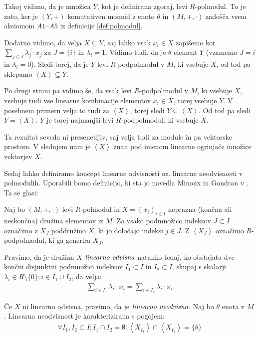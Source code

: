 \documentclass[mat1]{fmfdelo}
\newcommand{\pojem}[1]{\ensuremath{\emph{#1}}}
\newcommand{\Gen}[1]{\ensuremath{\left<{#1}\right>}}
\begin{document}
\begin{dokaz}
	
	Takoj vidimo, da je množica $Y$, kot je definirana zgoraj, levi $R$-polmodul. To je zato, ker je $(Y, +)$ komutativen monoid z enoto $\theta$ in $(M, +, \cdot)$ zadošča vsem aksiomom $A1$--$A5$ iz definicije \ref{def:polmodul}.
	
	Dodatno vidimo, da velja $X \subseteq Y$, saj lahko vsak $x_i\in X$ zapišemo kot $\sum_{j\in J}\lambda_j\cdot x_j$ za $J = \{i\}$ in $\lambda_i = 1$. Vidimo tudi, da je $\theta$ element $Y$ (vzamemo $J = {i}$ in $\lambda_i = 0$). Sledi torej, da je $Y$ levi $R$-podpolmodul v $M$, ki vsebuje $X$, od tod pa sklepamo $\Gen{X} \subseteq Y$. 
	
	Po drugi strani pa vidimo še, da vsak levi $R$-podpolmodul v $M$, ki vsebuje $X$, vsebuje tudi vse linearne kombinacije elementov $x_i\in X$, torej vsebuje $Y$. V posebnem primeru velja to tudi za \Gen{X}, torej sledi $Y \subseteq \Gen{X}$. Od tod pa sledi $Y = \Gen{X}$. $Y$ je torej najmanjši levi $R$-podpolmodul, ki vsebuje $X$.
\end{dokaz}

Ta rezultat seveda ni presenetljiv, saj velja tudi za module in pa vektorske prostore. V slednjem nam je \Gen{X} znan pod imenom linearne ogrinjače množice vektorjev $X$.

Sedaj lahko definiramo koncept linearne odvisnosti oz. linearne neodvisnosti v polmodulih. Uporabili bomo definicijo, ki sta jo navedla Minoux in Gondran v \cite[2.\,5.\,1.\,]{bib:Gondran}. Ta se glasi:

\begin{definicija}
	Naj bo $(M, +, \cdot)$ levi $R$-polmodul in $X = (x_i)_{i \in I}$ neprazna (končna ali neskončna) družina elementov iz $M$. Za vsako podmnožico indeksov $J \subset I$ označimo z $X_J$ poddružino $X$, ki jo določajo indeksi $j\in J$. Z $\Gen{X_J}$ označimo $R$-podpolmodul, ki ga generira $X_J$.
	
	Pravimo, da je družina $X$ \pojem{linearno odvisna} natanko tedaj, ko obstajata dve končni disjunktni podmnožici indeksov $I_1\subset I$ in $I_2\subset I$, skupaj s skalarji $\lambda_i \in R\setminus\{0\}; i\in I_1\cup I_2$, da velja: \begin{align*}
		\sum_{i \in I_1}\lambda_i\cdot x_i = \sum_{i \in I_2}\lambda_i\cdot x_i 
	\end{align*}

	Če $X$ ni linearno odvisna, pravimo, da je \pojem{linearno neodvisna}. Naj bo $\theta$ enota v $M$. Linearna neodvisnost je karakterizirana s pogojem: \begin{align}
		\forall I_1, I_2 \subset I; I_1\cap I_2 =\emptyset: \Gen{X_{I_1}}\cap\Gen{X_{I_2}} = \{\theta\}
	\end{align}
\end{definicija}
\end{document}

